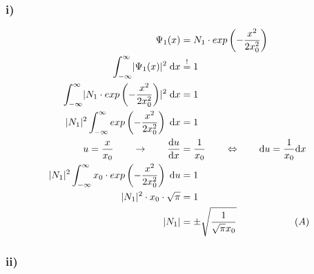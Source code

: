 \subsubsection{i)}

    \begin{align*}
        \Psi_1(x) &= N_1 \cdot exp \left(- \frac{x^2}{2x_0^2} \right)\\
        \int_{-\infty}^{\infty} \lvert\Psi_1 (x)\rvert^2 \; \mathrm{d}x &\stackrel{!}{=} 1\\
        \int_{-\infty}^{\infty} \lvert N_1 \cdot exp \left(-\frac{x^2}{2x_0^2} \right)\rvert ^2 \; \mathrm{d}x &= 1 \nonumber\\
        \lvert N_1\rvert^2 \int_{-\infty}^{\infty} exp \left(-\frac{x^2}{2x_0^2} \right) \; \mathrm{d}x &= 1 \nonumber\\
        u = \frac{x}{x_0} \qquad \rightarrow \qquad \frac{\mathrm{d}u}{\mathrm{d}x} &= \frac{1}{x_0} 
        \qquad \Leftrightarrow \qquad \mathrm{d}u = \frac{1}{x_0} \mathrm{d}x \nonumber\\
        \lvert N_1\rvert^2 \int_{-\infty}^{\infty} x_0 \cdot exp \left(-\frac{x^2}{2x_0^2} \right) \; \mathrm{d}u &= 1 \nonumber\\
        \lvert N_1\rvert^2 \cdot x_0 \cdot \sqrt{\pi} &= 1 \nonumber\\
        \lvert N_1\rvert &= \pm \sqrt{\frac{1}{\sqrt{\pi}x_0}} \qquad \qquad \qquad (A)
    \end{align*}

\subsubsection{ii)}

